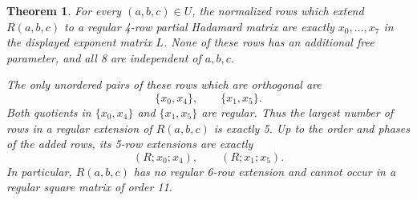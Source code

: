 \documentclass[11pt,a4paper]{article}
\newtheorem{theorem}{Theorem}[section]
\theoremstyle{plain}
\theoremstyle{definition}
\theoremstyle{plain}
\begin{document}
\par\addvspace{\medskipamount}\noindent
\begin{minipage}{\linewidth}
\begin{theorem}\label{n11_generic:main}
For every $(a,b,c)\in U$, the normalized rows which extend $R(a,b,c)$ to a regular 4-row partial Hadamard matrix are exactly $x_0,\ldots,x_7$ in the displayed exponent matrix $L$. None of these rows has an additional free parameter, and all 8 are independent of $a,b,c$.

The only unordered pairs of these rows which are orthogonal are
\[
\{x_0,x_4\},\qquad \{x_1,x_5\}.
\]
Both quotients in $\{x_0,x_4\}$ and $\{x_1,x_5\}$ are regular. Thus the largest number of rows in a regular extension of $R(a,b,c)$ is exactly 5. Up to the order and phases of the added rows, its 5-row extensions are exactly
\[
(R;x_0;x_4),\qquad (R;x_1;x_5).
\]
In particular, $R(a,b,c)$ has no regular 6-row extension and cannot occur in a regular square matrix of order 11.
\end{theorem}
\end{minipage}
\par\addvspace{\medskipamount}
\end{document}
